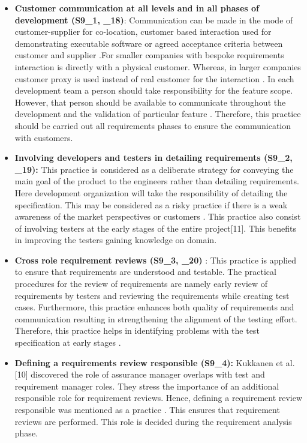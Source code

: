 \documentclass{article}
\begin{document}
\begin{itemize}
    \item \textbf{Customer communication at all levels and in all phases of development (S9\_1, \cite{bjarnason2014alignment}\_18)}: Communication can be made in the mode of customer-supplier for co-location, customer based interaction used for demonstrating executable software or agreed acceptance criteria between customer and supplier \cite{bjarnason2014challenges}.For smaller companies with bespoke requirements interaction is directly with a physical customer. Whereas, in larger companies customer proxy is used instead of real customer for the interaction \cite{bjarnason2014challenges}. In each development team a person should take responsibility for the feature scope. However, that person should be available to communicate throughout the development and the validation of particular feature \cite{bjarnason2014challenges}. Therefore, this practice should be carried out all requirements phases to ensure the communication with customers.
    \item \textbf{Involving developers and testers in detailing requirements (S9\_2,  \cite{bjarnason2014alignment}\_19): }
    This practice is considered as a deliberate strategy for conveying the main goal of the product to the engineers rather than detailing requirements. Here development organization will take the responsibility of detailing the specification. This may be considered as a risky practice if there is a weak awareness of the market perspectives or customers \cite{bjarnason2014challenges}. This practice also consist of involving testers at the early stages of the entire project[11]. This benefits in improving the testers gaining knowledge on domain\cite{bjarnason2014challenges}. 
    \item \textbf{Cross role requirement reviews (S9\_3, \cite{bjarnason2014alignment}\_20)} : This practice is applied to ensure that requirements are understood and testable. The practical procedures for the review of requirements are namely early review of requirements by testers and reviewing the requirements while creating test cases. Furthermore, this practice enhances both quality of requirements and communication resulting in strengthening the alignment of the testing effort. Therefore, this practice helps in identifying problems with the test specification at early stages \cite{bjarnason2014challenges}. 
    \item \textbf{Defining a requirements review responsible (S9\_4):} Kukkanen et al. [10] discovered the role of assurance manager overlaps with test and requirement manager roles. They stress the importance of an additional responsible role for requirement reviews. Hence, defining a requirement review responsible was mentioned as a practice \cite{bjarnason2014challenges}. This ensures that requirement reviews are performed. This role is decided during the requirement analysis phase.
    

\end{itemize}
\end{document}
